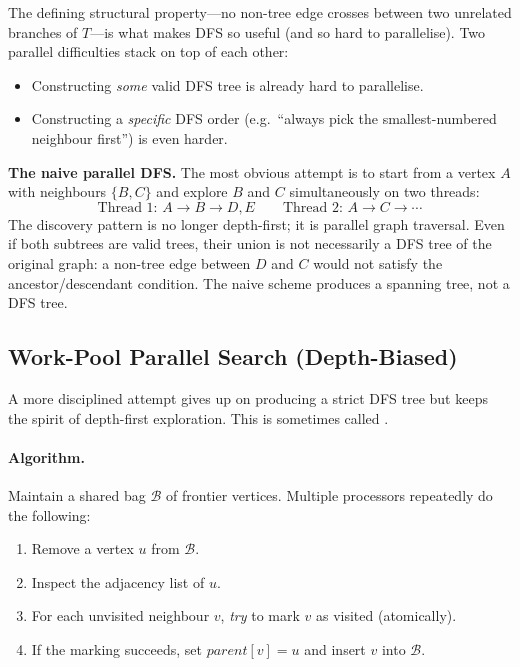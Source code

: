 The defining structural property---no non-tree edge crosses between
two unrelated branches of $T$---is what makes DFS so useful (and so
hard to parallelise).  Two parallel difficulties stack on top of each
other:

\begin{itemize}
  \item Constructing \emph{some} valid DFS tree is already hard to
        parallelise.
  \item Constructing a \emph{specific} DFS order (e.g.\ ``always pick
        the smallest-numbered neighbour first'') is even harder.
\end{itemize}

\begin{ppexample}
\textbf{The naive parallel DFS.}
The most obvious attempt is to start from a vertex $A$ with neighbours
$\{B, C\}$ and explore $B$ and $C$ simultaneously on two threads:
\[
  \text{Thread 1: } A \to B \to D, E \qquad
  \text{Thread 2: } A \to C \to \cdots
\]
The discovery pattern is no longer depth-first; it is parallel
graph traversal.  Even if both subtrees are valid trees, their union
is not necessarily a DFS tree of the original graph: a non-tree edge
between $D$ and $C$ would not satisfy the ancestor/descendant
condition.  The naive scheme produces a spanning tree, not a DFS tree.
\end{ppexample}

\subsection{Work-Pool Parallel Search (Depth-Biased)}

A more disciplined attempt gives up on producing a strict DFS tree but
keeps the spirit of depth-first exploration.  This is sometimes called
.

\paragraph{Algorithm.}
Maintain a shared bag $\mathcal{B}$ of frontier vertices.  Multiple
processors repeatedly do the following:
\begin{enumerate}
  \item Remove a vertex $u$ from $\mathcal{B}$.
  \item Inspect the adjacency list of $u$.
  \item For each unvisited neighbour $v$, \emph{try} to mark $v$ as
        visited (atomically).
  \item If the marking succeeds, set $\mathit{parent}[v] = u$ and
        insert $v$ into $\mathcal{B}$.
\end{enumerate}

